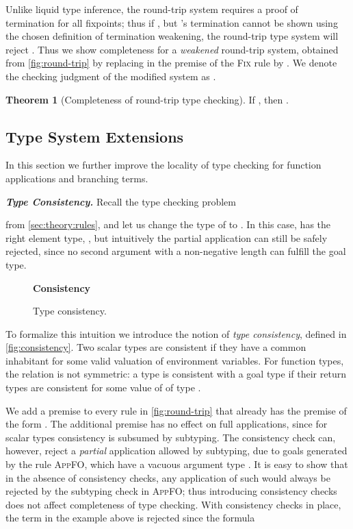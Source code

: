 \documentclass[10pt,preprint]{sigplanconf-pldi16}
\theoremstyle{definition}
\newtheorem{theorem}{Theorem}
\newcommand{\custompar}[1]{\parskip 0pt \textbf{\textit{#1}}}
\begin{document}
Unlike liquid type inference, the round-trip system requires a proof of termination for all fixpoints;
thus if ,
but 's termination cannot be shown using the chosen definition of termination weakening,
the round-trip type system will reject .
Thus we show completeness for a \emph{weakened} round-trip system,
obtained from \autoref{fig:round-trip} by replacing  in the premise of the \textsc{Fix} rule by .
We denote the checking judgment of the modified system as .

\begin{theorem}[Completeness of round-trip type checking]
If , then .
\end{theorem}


\subsection{Type System Extensions}\label{sec:theory:extensions}

In this section we further improve the locality of type checking for
function applications and branching terms.

\custompar{Type Consistency.}
Recall the type checking problem 

from \autoref{sec:theory:rules}, and let us change the type of  to .
In this case,  has the right element type, ,
but intuitively the partial application  can still be safely rejected,
since no second argument with a non-negative length can fulfill the goal type.

\begin{figure}
\small
\textbf{Consistency}\quad

\caption{Type consistency.}\label{fig:consistency}
\end{figure}

To formalize this intuition we introduce the notion of \emph{type consistency}, defined in \autoref{fig:consistency}.
Two scalar types are consistent if they have a common inhabitant for some valid valuation of environment variables.
For function types, the relation is not symmetric:
a type  is consistent with a goal type if their return types are consistent for some value of  of type .

We add a premise  to every rule in \autoref{fig:round-trip}
that already has the premise of the form .
The additional premise has no effect on full applications, since for scalar types consistency is subsumed by subtyping.
The consistency check can, however, reject a \emph{partial} application  allowed by subtyping,
due to goals generated by the rule \textsc{AppFO}, which have a vacuous argument type .
It is easy to show that in the absence of consistency checks, 
any application of such  would always be rejected by the subtyping check in \textsc{AppFO};
thus introducing consistency checks does not affect completeness of type checking.
With consistency checks in place, 
the term  in the example above is rejected since the formula
\end{document}
